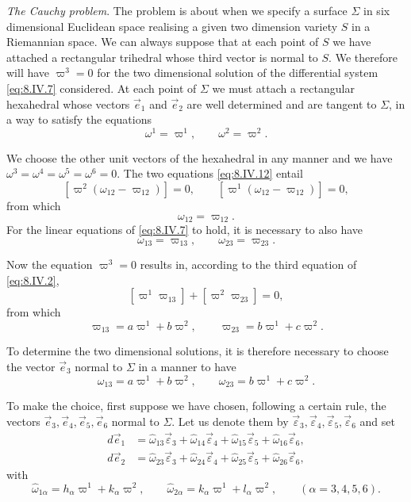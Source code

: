 \documentclass[leqno,11pt]{book}
\numberwithin{equation}{chapter}
\theoremstyle{shape1}
\theoremstyle{shape0}
\theoremstyle{shape2}
\theoremstyle{definition}
\begin{document}
\vspace{12pt}\fsec \emph{The Cauchy problem}. The problem is about when we specify a surface $\Sigma$ in six dimensional Euclidean space realising a given two dimension variety $S$ in a Riemannian space. We can always suppose that at each point of $S$ we have attached a rectangular trihedral whose third vector is normal to $S$. We therefore will have $\varpi^{3}=0$ for the two dimensional solution of the differential system \eqref{eq:8.IV.7} considered. At each point of $\Sigma$ we must attach a rectangular hexahedral whose vectors $\vec e_{1}$ and $\vec e_{2}$ are well determined and are tangent to $\Sigma$, in a way to satisfy the equations
\begin{equation}
  \label{eq:8.IV.12}\tag{IV, 12}
  \omega^{1}=\varpi^{1},\qquad\omega^{2}=\varpi^{2}.
\end{equation}

We choose the other unit vectors of the hexahedral in any manner and we have $\omega^{3}=\omega^{4}=\omega^{5}=\omega^{6}=0$. The two equations \eqref{eq:8.IV.12} entail
\[
[\varpi^{2}(\omega_{12}-\varpi_{12})]=0,\qquad[\varpi^{1}(\omega_{12}-\varpi_{12})]=0,
\]
from which
\[
\omega_{12}=\varpi_{12}.
\]
For the linear equations of \eqref{eq:8.IV.7} to hold, it is necessary to also have
\[
\omega_{13}=\varpi_{13},\qquad\omega_{23}=\varpi_{23}.
\]

Now the equation $\varpi^{3}=0$ results in, according to the third equation of \eqref{eq:8.IV.2},
\[
[\varpi^{1}\varpi_{13}]+[\varpi^{2}\varpi_{23}]=0,
\]
from which
\[
\varpi_{13}=a\varpi^{1}+b\varpi^{2},\qquad\varpi_{23}=b\varpi^{1}+c\varpi^{2}.
\]

To determine the two dimensional solutions, it is therefore necessary to choose the vector $\vec e_{3}$ normal to $\Sigma$ in a manner to have
\begin{equation}
  \label{eq:8.IV.13}\tag{IV, 13}
  \omega_{13}=a\varpi^{1}+b\varpi^{2},\qquad\omega_{23}=b\varpi^{1}+c\varpi^{2}.
\end{equation}

To make the choice, first suppose we have chosen, following a certain rule, the vectors $\vec e_{3},\vec e_{4},\vec e_{5},\vec e_{6}$ normal to $\Sigma$. Let us denote them by $\vec\varepsilon_{3},\vec\varepsilon_{4},\vec\varepsilon_{5},\vec\varepsilon_{6}$ and set
\begin{align*}
  d\vec e_{1}&=\hat\omega_{13}\vec\varepsilon_{3}+\hat\omega_{14}\vec\varepsilon_{4}+\hat\omega_{15}\vec\varepsilon_{5}+\hat\omega_{16}\vec\varepsilon_{6},\\
  d\vec e_{2}&=\hat\omega_{23}\vec\varepsilon_{3}+\hat\omega_{24}\vec\varepsilon_{4}+\hat\omega_{25}\vec\varepsilon_{5}+\hat\omega_{26}\vec\varepsilon_{6},
\end{align*}
with
\[
\hat\omega_{1\alpha}=h_{\alpha}\varpi^{1}+k_{\alpha}\varpi^{2},\qquad\hat\omega_{2\alpha}=k_{\alpha}\varpi^{1}+l_{\alpha}\varpi^{2},\qquad(\alpha=3,4,5,6).
\]
\end{document}
